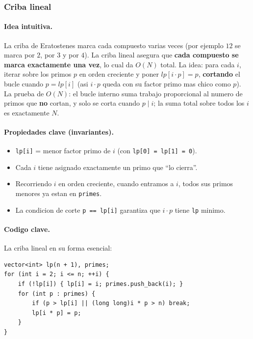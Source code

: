 ﻿\subsubsection{Criba lineal}

\paragraph{Idea intuitiva.}
La criba de Eratostenes marca cada compuesto varias veces (por ejemplo $12$ se marca por $2$, por $3$ y por $4$). La criba lineal asegura que \textbf{cada compuesto se marca exactamente una vez}, lo cual da $O(N)$ total. La idea: para cada $i$, iterar sobre los primos $p$ en orden creciente y poner $lp[i \cdot p] = p$, \textbf{cortando} el bucle cuando $p = lp[i]$ (asi $i \cdot p$ queda con su factor primo mas chico como $p$). La prueba de $O(N)$: el bucle interno suma trabajo proporcional al numero de primos que \textbf{no} cortan, y solo se corta cuando $p \mid i$; la suma total sobre todos los $i$ es exactamente $N$.

\paragraph{Propiedades clave (invariantes).}
\begin{itemize}\setlength\itemsep{0pt}
	\item \texttt{lp[i]} = menor factor primo de $i$ (con \texttt{lp[0] = lp[1] = 0}).
	\item Cada $i$ tiene asignado exactamente un primo que ``lo cierra''.
	\item Recorriendo $i$ en orden creciente, cuando entramos a $i$, todos sus primos menores ya estan en \texttt{primes}.
	\item La condicion de corte \texttt{p == lp[i]} garantiza que $i \cdot p$ tiene \texttt{lp} minimo.
\end{itemize}

\paragraph{Codigo clave.}
La criba lineal en su forma esencial:
\begin{verbatim}
vector<int> lp(n + 1), primes;
for (int i = 2; i <= n; ++i) {
    if (!lp[i]) { lp[i] = i; primes.push_back(i); }
    for (int p : primes) {
        if (p > lp[i] || (long long)i * p > n) break;
        lp[i * p] = p;
    }
}
\end{verbatim}

